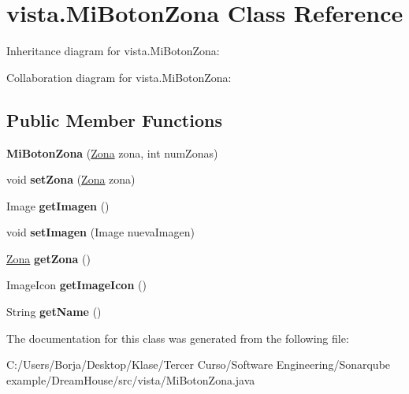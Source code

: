 \hypertarget{classvista_1_1_mi_boton_zona}{}\section{vista.\+Mi\+Boton\+Zona Class Reference}
\label{classvista_1_1_mi_boton_zona}


Inheritance diagram for vista.\+Mi\+Boton\+Zona\+:


Collaboration diagram for vista.\+Mi\+Boton\+Zona\+:
\subsection*{Public Member Functions}
\begin{DoxyCompactItemize}
\item 
\mbox{\label{classvista_1_1_mi_boton_zona_a5c7db8e9a25ef3810dfc8fba178d1c78}} 
{\bfseries Mi\+Boton\+Zona} (\mbox{\hyperlink{classmodelo_1_1_zona}{Zona}} zona, int num\+Zonas)
\item 
\mbox{\label{classvista_1_1_mi_boton_zona_ac5964febf18a57ff4b3e563cc30ac2fa}} 
void {\bfseries set\+Zona} (\mbox{\hyperlink{classmodelo_1_1_zona}{Zona}} zona)
\item 
\mbox{\label{classvista_1_1_mi_boton_zona_a24c233777bcd781e7d560bea342c4824}} 
Image {\bfseries get\+Imagen} ()
\item 
\mbox{\label{classvista_1_1_mi_boton_zona_a1ee248301e0b3a6c07ba4e0b6e43f8a7}} 
void {\bfseries set\+Imagen} (Image nueva\+Imagen)
\item 
\mbox{\label{classvista_1_1_mi_boton_zona_a7e603b1af30532a70204b3aa85ec72ea}} 
\mbox{\hyperlink{classmodelo_1_1_zona}{Zona}} {\bfseries get\+Zona} ()
\item 
\mbox{\label{classvista_1_1_mi_boton_zona_a9fca131b63c836c783e27e0c3f649b97}} 
Image\+Icon {\bfseries get\+Image\+Icon} ()
\item 
\mbox{\label{classvista_1_1_mi_boton_zona_a642b9f1a6875fbb25a818c29329ac1c3}} 
String {\bfseries get\+Name} ()
\end{DoxyCompactItemize}


The documentation for this class was generated from the following file\+:\begin{DoxyCompactItemize}
\item 
C\+:/\+Users/\+Borja/\+Desktop/\+Klase/\+Tercer Curso/\+Software Engineering/\+Sonarqube example/\+Dream\+House/src/vista/Mi\+Boton\+Zona.\+java\end{DoxyCompactItemize}
